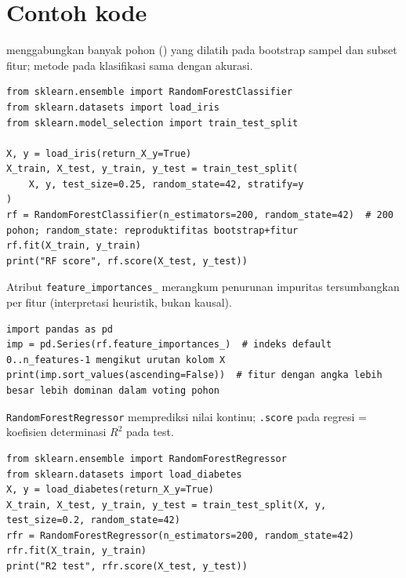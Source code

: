 \documentclass[../main.tex]{subfiles}
\begin{document}


\section{Contoh kode}

\MulaiPenjelasanKode {} menggabungkan banyak pohon () yang dilatih pada bootstrap sampel dan subset fitur; metode  pada klasifikasi sama dengan akurasi. \SelesaiPenjelasanKode

\begin{lstlisting}[caption=RandomForestClassifier pada Iris]
from sklearn.ensemble import RandomForestClassifier
from sklearn.datasets import load_iris
from sklearn.model_selection import train_test_split

X, y = load_iris(return_X_y=True)
X_train, X_test, y_train, y_test = train_test_split(
    X, y, test_size=0.25, random_state=42, stratify=y
)
rf = RandomForestClassifier(n_estimators=200, random_state=42)  # 200 pohon; random_state: reproduktifitas bootstrap+fitur
rf.fit(X_train, y_train)
print("RF score", rf.score(X_test, y_test))
\end{lstlisting}

\MulaiPenjelasanKode Atribut \texttt{feature\_importances\_} merangkum penurunan impuritas tersumbangkan per fitur (interpretasi heuristik, bukan kausal). \SelesaiPenjelasanKode

\begin{lstlisting}[caption=Importansi fitur (urutkan)]
import pandas as pd
imp = pd.Series(rf.feature_importances_)  # indeks default 0..n_features-1 mengikut urutan kolom X
print(imp.sort_values(ascending=False))  # fitur dengan angka lebih besar lebih dominan dalam voting pohon
\end{lstlisting}

\MulaiPenjelasanKode \texttt{RandomForestRegressor} memprediksi nilai kontinu; \texttt{.score} pada regresi = koefisien determinasi $R^2$ pada test. \SelesaiPenjelasanKode

\begin{lstlisting}[caption=RandomForestRegressor (diabetes)]
from sklearn.ensemble import RandomForestRegressor
from sklearn.datasets import load_diabetes
X, y = load_diabetes(return_X_y=True)
X_train, X_test, y_train, y_test = train_test_split(X, y, test_size=0.2, random_state=42)
rfr = RandomForestRegressor(n_estimators=200, random_state=42)
rfr.fit(X_train, y_train)
print("R2 test", rfr.score(X_test, y_test))
\end{lstlisting}
\end{document}
